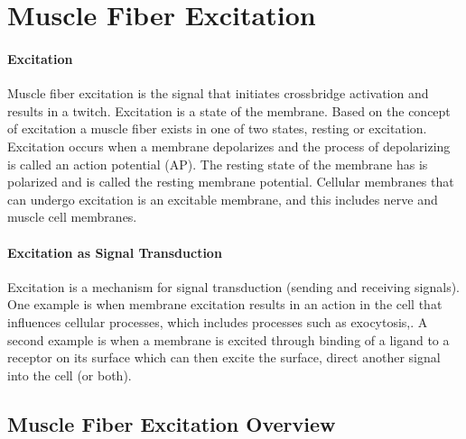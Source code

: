 \section{Muscle Fiber Excitation} %
\paragraph{Excitation}
Muscle fiber excitation is the signal that initiates crossbridge activation and results in a twitch. Excitation is a state of the membrane. Based on the concept of excitation a muscle fiber exists in one of two states, resting or excitation. Excitation occurs when a membrane depolarizes and the process of depolarizing is called an action potential (AP). The resting state of the membrane has is polarized and is called the resting membrane potential. Cellular membranes that can undergo excitation is an excitable membrane, and this includes nerve and muscle cell membranes. 
\paragraph{Excitation as Signal Transduction}
Excitation is a mechanism for signal transduction (sending and receiving signals). One example is when membrane excitation results in an action in the cell that influences cellular processes, which includes processes such as exocytosis,\footnotemark{}. A second example is when a membrane is excited through binding of a ligand\footnotemark{} to a receptor on its surface which can then excite the surface, direct another signal into the cell (or both). 

\subsection{Muscle Fiber Excitation Overview}
\paragraph{}

